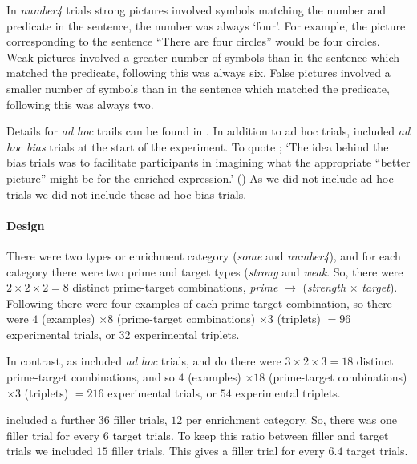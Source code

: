 \documentclass[10pt]{article}
\begin{document}
\begin{multicols}{2}
In \emph{number4} trials strong pictures involved symbols matching the number and predicate in the sentence, the number was always `four'.
For example, the picture corresponding to the sentence ``There are four circles'' would be four circles.
Weak pictures involved a greater number of symbols than in the sentence which matched the predicate, following \citeauthor{Bott:2016aa} this was always six.
False pictures involved a smaller number of symbols than in the sentence which matched the predicate, following \citeauthor{Bott:2016aa} this was always two.

Details for \emph{ad hoc} trails can be found in \textcite[123--124]{Bott:2016aa}.
In addition to ad hoc trials, \citeauthor{Bott:2016aa} included \emph{ad hoc bias} trials at the start of the experiment.
To quote \citeauthor{Bott:2016aa}; `The idea behind the bias trials was to facilitate participants in imagining what the appropriate ``better picture'' might be for the enriched expression.' (\citeyear[124]{Bott:2016aa})
As we did not include ad hoc trials we did not include these ad hoc bias trials.

\paragraph{Design}
There were two types or enrichment category (\emph{some} and \emph{number4}), and for each category there were two prime and target types (\emph{strong} and \emph{weak}.
So, there were \(2 \times 2 \times 2 = 8\) distinct prime-target combinations, \emph{prime} \(\rightarrow\) (\emph{strength} \(\times\) \emph{target}).
Following \citeauthor{Bott:2016aa} there were four examples of each prime-target combination, so there were \(4\) (examples) \(\times 8\) (prime-target combinations) \(\times 3\) (triplets) \(= 96\) experimental trials, or \(32\) experimental triplets.

In contrast, as \citeauthor{Bott:2016aa} included \emph{ad hoc} trials, and do there were \(3 \times 2 \times 3 = 18\) distinct prime-target combinations, and so  \(4\) (examples) \(\times 18\) (prime-target combinations) \(\times 3\) (triplets) \(= 216\) experimental trials, or \(54\) experimental triplets.

\citeauthor{Bott:2016aa} included a further \(36\) filler trials, \(12\) per enrichment category.
So, there was one filler trial for every \(6\) target trials.
To keep this ratio between filler and target trials we included \(15\) filler trials.
This gives a filler trial for every \(6.4\) target trials.


\end{multicols}
\end{document}

